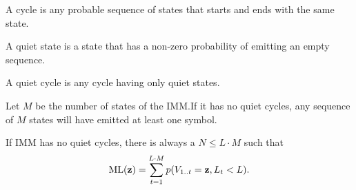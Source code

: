\begin{definition}
  A cycle is any probable sequence of states that starts and ends with the same state.
\end{definition}

\begin{definition}
  A quiet state is a state that has a non-zero probability of emitting an empty sequence.
\end{definition}

\begin{definition}
  A quiet cycle is any cycle having only quiet states.
\end{definition}

\begin{corollary}
  Let $M$ be the number of states of the IMM.\@ If it has no quiet cycles, any sequence of $M$ states
  will have emitted at least one symbol.
\end{corollary}

If IMM has no quiet cycles, there is always a $N \leq L\cdot M$ such that
\begin{equation*}
  \mathrm{ML}(\mathbf{z}) = \sum_{t=1}^{L\cdot M} p(V_{1..t}=\mathbf{z}, L_t<L).
\end{equation*}
